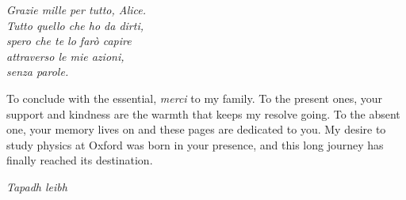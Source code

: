 \begin{center}
\textit{Grazie mille per tutto, Alice.}\\
\textit{Tutto quello che ho da dirti,}\\
\textit{spero che te lo farò capire}\\
\textit{attraverso le mie azioni,}\\
\textit{senza parole.} \\
\end{center}

To conclude with the essential, \textit{merci} to my family. To the present ones, your support and kindness are the warmth that keeps my resolve going. To the absent one, your memory lives on and these pages are dedicated to you. My desire to study physics at Oxford was born in your presence, and this long journey has finally reached its destination. \\
\begin{center}
\textit{\color{oxfordblue} Tapadh leibh}
\end{center}
